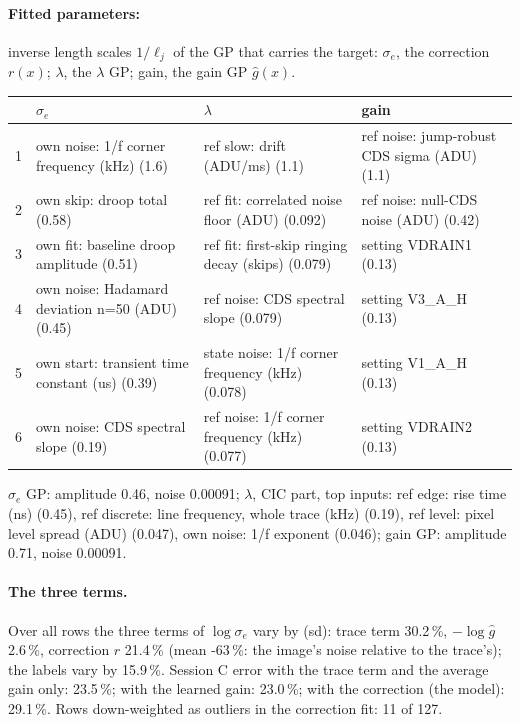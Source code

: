 \paragraph{Fitted parameters:} inverse length scales $1/\ell_j$ of the GP that carries the target: $\sigma_e$, the correction $r(x)$; $\lambda$, the $\lambda$ GP; gain, the gain GP $\hat g(x)$.
\begin{center}\footnotesize
\begin{tabular}{rp{}p{}p{}}
\toprule
 & $\sigma_e$ & $\lambda$ & gain \\
\midrule
1 & own noise: 1/f corner frequency (kHz) (1.6) & ref slow: drift (ADU/ms) (1.1) & ref noise: jump-robust CDS sigma (ADU) (1.1) \\
2 & own skip: droop total (0.58) & ref fit: correlated noise floor (ADU) (0.092) & ref noise: null-CDS noise (ADU) (0.42) \\
3 & own fit: baseline droop amplitude (0.51) & ref fit: first-skip ringing decay (skips) (0.079) & setting VDRAIN1 (0.13) \\
4 & own noise: Hadamard deviation n=50 (ADU) (0.45) & ref noise: CDS spectral slope (0.079) & setting V3\_A\_H (0.13) \\
5 & own start: transient time constant (us) (0.39) & state noise: 1/f corner frequency (kHz) (0.078) & setting V1\_A\_H (0.13) \\
6 & own noise: CDS spectral slope (0.19) & ref noise: 1/f corner frequency (kHz) (0.077) & setting VDRAIN2 (0.13) \\
\bottomrule
\end{tabular}
\end{center}
{\footnotesize $\sigma_e$ GP: amplitude 0.46, noise 0.00091; $\lambda$, CIC part, top inputs: ref edge: rise time (ns) (0.45), ref discrete: line frequency, whole trace (kHz) (0.19), ref level: pixel level spread (ADU) (0.047), own noise: 1/f exponent (0.046); gain GP: amplitude 0.71, noise 0.00091.}
\paragraph{The three terms.}
Over all rows the three terms of $\log\sigma_e$ vary by (sd): trace term 30.2\,\%, $-\log\hat g$ 2.6\,\%, correction $r$ 21.4\,\% (mean -63\,\%: the image's noise relative to the trace's); the labels vary by 15.9\,\%. Session C error with the trace term and the average gain only: 23.5\,\%; with the learned gain: 23.0\,\%; with the correction (the model): 29.1\,\%. Rows down-weighted as outliers in the correction fit: 11 of 127.
